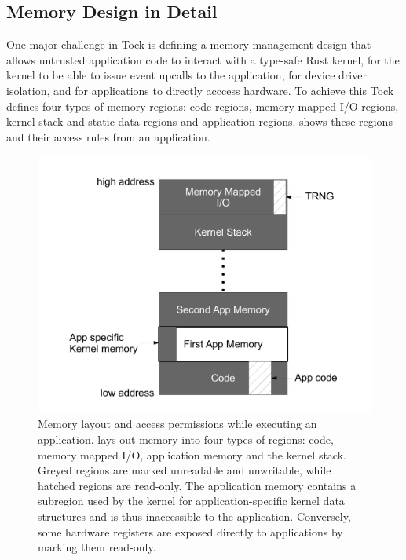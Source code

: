\subsection{\name Memory Design in Detail}
\label{sec:arch:memory-design}

One major challenge in Tock is defining a memory management design
that allows untrusted application code 
to interact with a type-safe Rust kernel, for the kernel to be able to
issue event upcalls to the application, for device driver isolation, and 
for applications to directly
acccess hardware. To achieve this
Tock defines four types of memory regions: code regions, 
memory-mapped I/O regions,
kernel stack and static data regions and application regions.
 shows these regions and their access rules from
an application.

\begin{figure}
 \centering
\includegraphics[width=1\columnwidth]{img/memory-layout}
\caption{Memory layout and access permissions while executing an application.
\name lays out memory into four types of regions: code, memory mapped I/O,
application memory and the kernel stack. Greyed regions are marked unreadable
and unwritable, while hatched regions are read-only. The application memory
contains a subregion used by the kernel for application-specific kernel data
structures and is thus inaccessible to the application. Conversely, some
hardware registers are exposed directly to applications by marking them
read-only.}
 \label{fig:memory-layout}
\end{figure}



